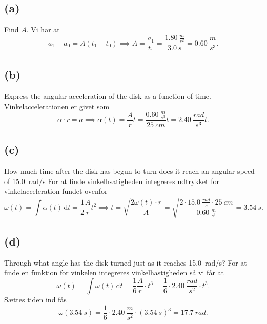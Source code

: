 \documentclass[12pt]{article}
\begin{document}
\subsection*{(a)}
Find $A$.
\bigbreak
Vi har at
\[
a_1 - a_0 = A(t_1 - t_0) \implies A = \frac{a_1}{t_1} = \frac{\qty{1,80}{\frac{m}{s^2}}}{\qty{3,0}{s}} = \qty{0,60}{\frac{m}{s^3}}
.\] 

\subsection*{(b)}
Express the angular acceleration of the disk as a function of time.
\bigbreak
Vinkelaccelerationen er givet som
\[
\alpha\cdot r = a \implies \alpha (t) = \frac{A}{r}t = \frac{\qty{0,60}{\frac{m}{s^3}}}{\qty{25}{cm}}t = \qty{2,40}{\frac{rad}{s^3}}t
.\] 


\subsection*{(c)}
How much time after the disk has begun to turn does it reach an angular speed of \qty{15,0}{rad/s}
\bigbreak
For at finde vinkelhsatigheden integreres udtrykket for vinkelacceleration fundet ovenfor
\[
  \omega(t) = \int \alpha(t) \, \mathrm{d}t = \frac{1}{2}\frac{A}{r}t^2 \implies t = \sqrt{\frac{2\omega(t)\cdot r}{A}} = \sqrt{\frac{2\cdot \qty{15,0}{\frac{rad}{s}}\cdot \qty{25}{cm}}{\qty{0,60}{\frac{m}{s^3}}}} = \qty{3,54}{s}
.\] 



\subsection*{(d)}
Through what angle has the disk turned just as it reaches \qty{15,0}{rad/s}?
\bigbreak
For at finde en funktion for vinkelen integreres vinkelhastigheden så vi får at
\[
\omega(t) = \int \omega(t) \, \mathrm{d}t = \frac{1}{6}\frac{A}{r}\cdot t^3 = \frac{1}{6}\cdot \qty{2,40}{\frac{rad}{s^2}}\cdot t^3 
.\]
Sættes tiden ind fås
\[
\omega(\qty{3,54}{s}) = \frac{1}{6}\cdot \qty{2,40}{\frac{m}{s^2}}\cdot (\qty{3,54}{s})^3 = \qty{17,7}{rad}
.\] 
  
\end{document}
